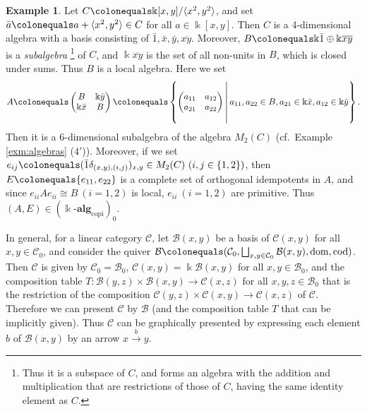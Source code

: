 \documentclass{surv-l}
\numberwithin{equation}{chapter}
\numberwithin{figure}{chapter}
\theoremstyle{plain}
\theoremstyle{definition}
\newtheorem{exm}[thm]{Example}
\theoremstyle{remark}
\DeclareMathOperator{\dom}{dom}
\DeclareMathOperator{\cod}{cod}
\begin{document}
\begin{exm}\label{exm:selfinjNak2-3}
Let $C\colonequals  \Bbbk[x,y]/{\langle x^2, y^2 \rangle}$, and
set $\bar{a}\colonequals  a+ {\langle x^2, y^2 \rangle} \in C$ for all $a \in \Bbbk[x,y]$.
Then $C$ is a 4-dimensional algebra with a basis consisting of
$\bar{1}, \bar{x}, \bar{y}, \overline{xy}$.
Moreover, $B\colonequals  \Bbbk\bar{1}\oplus \Bbbk\overline{xy}$ is a \emph{subalgebra}
\footnote{
Thus it is a subspace of $C$, and forms an algebra with the addition and
multiplication that are restrictions of those of $C$,
having the same identity element as $C$.}
of $C$, and $\Bbbk\overline{xy}$ is the set of all non-units in $B$,
which is closed under sums.
Thus $B$ is a local algebra.
Here we set
\[
A\colonequals  \begin{pmatrix} B & \Bbbk\bar{y}\\ \Bbbk\bar{x} & B \end{pmatrix}\colonequals 
\left\{\begin{pmatrix} a_{11} & a_{12}\\a_{21} & a_{22} \end{pmatrix} \,\rule[-5ex]{0.5pt}{11ex}\
a_{11}, a_{22} \in B, a_{21} \in \Bbbk\bar{x}, a_{12} \in \Bbbk\bar{y} \right\}.
\]
Then it is a 6-dimensional subalgebra of the algebra
$M_2(C)$ (cf.\ Example \ref{exm:algebras} ($4'$)).
Moreover,
if we set $e_{ij}\colonequals  (\bar{1}\delta_{(x,y),(i,j)})_{x,y} \in M_2(C)\ (i, j \in \{1,2\})$,
then
$E\colonequals  \{e_{11}, e_{22}\}$ is a complete set of orthogonal idempotents in $A$,
and since $e_{ii}Ae_{ii} \cong B\ (i = 1,2)$ is local,
$e_{ii}\ (i = 1,2)$ are primitive.
Thus $(A, E) \in (\Bbbk\text{-}\mathbf{alg}_{\mathrm{copi}})_0$.

In general, for a linear category ${\mathcal{C}}$,
let $\mathcal{B}(x,y)$ be a basis of ${\mathcal{C}}(x,y)$ for all $x, y \in {\mathcal{C}}_0$, and
consider the quiver $\mathcal{B}\colonequals  ({\mathcal{C}}_0, \bigsqcup_{x,y \in {\mathcal{C}}_0}\mathcal{B}(x,y), \dom, \cod)$.
Then ${\mathcal{C}}$ is given by ${\mathcal{C}}_0 = \mathcal{B}_0$,
${\mathcal{C}}(x,y) = \Bbbk\mathcal{B}(x,y)$ for all $x,y \in \mathcal{B}_0$, and
the composition table $T\colon \mathcal{B}(y,z) \times \mathcal{B}(x,y) \to {\mathcal{C}}(x,z)$
for all $x,y,z \in \mathcal{B}_0$ that is the restriction of the composition
${\mathcal{C}}(y,z) \times {\mathcal{C}}(x,y) \to {\mathcal{C}}(x,z)$ of ${\mathcal{C}}$.
Therefore we can present ${\mathcal{C}}$ by $\mathcal{B}$
(and the composition table $T$ that can be implicitly given).
Thus ${\mathcal{C}}$ can be graphically presented by expressing each element $b$
of $\mathcal{B}(x,y)$ by an arrow $x \xrightarrow{b} y$.


\end{exm}
\end{document}
